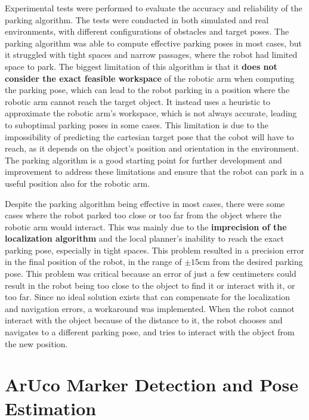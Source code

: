 Experimental tests were performed to evaluate the accuracy and reliability of the parking algorithm.
The tests were conducted in both simulated and real environments, with different configurations of obstacles
and target poses. The parking algorithm was able to compute effective parking poses in most cases,
but it struggled with tight spaces and narrow passages, where the robot had limited space to park.
The biggest limitation of this algorithm is that it \textbf{does not consider the exact feasible workspace} of the robotic arm
when computing the parking pose, which can lead to the robot parking in a position where the robotic arm
cannot reach the target object. It instead uses a heuristic to approximate the robotic arm's workspace,
which is not always accurate, leading to suboptimal parking poses in some cases.
This limitation is due to the impossibility of predicting the cartesian
target pose that the cobot will have to reach, as it depends on the object's position and orientation
in the environment. The parking algorithm is a good starting point for further development and improvement
to address these limitations and ensure that the robot can park in a useful position also for the robotic arm.

Despite the parking algorithm being effective in most cases, there were some cases where the robot parked too close
or too far from the object where the robotic arm would interact. This was mainly due to the
\textbf{imprecision of the localization algorithm} and the local planner's inability to reach the exact parking pose,
especially in tight spaces. This problem resulted in a precision error 
in the final position of the robot, in the range of $\pm 15$cm from the desired parking pose. This problem was
critical because an error of just a few centimeters could result in the robot being too close to the object
to find it or interact with it, or too far. Since no ideal solution exists that
can compensate for the localization and navigation errors, a workaround was implemented. When the robot cannot interact 
with the object because of the distance to it, the robot chooses and navigates to a different parking pose,
and tries to interact with the object from the new position. 

\section{ArUco Marker Detection and Pose Estimation}
\label{sec:multiaruco}

